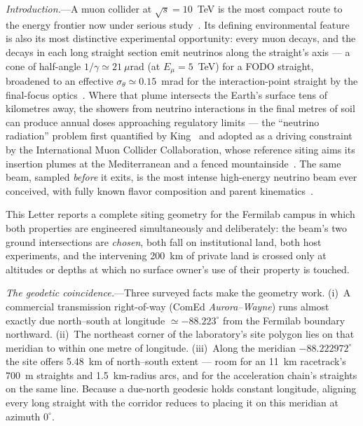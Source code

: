 \documentclass[aps,prl,reprint,superscriptaddress,nofootinbib]{revtex4-2}
\begin{document}
\emph{Introduction.}---A muon collider at
$\sqrt{s}=10$~TeV is the most compact route to the
energy frontier now under serious study~\cite{MCForum,IMCC}. Its defining
environmental feature is also its most distinctive experimental
opportunity: every muon decays, and the decays in each long straight
section emit neutrinos along the straight's axis --- a cone of half-angle
$1/\gamma \simeq 21~\mu$rad (at $E_\mu = 5$~TeV) for a FODO straight,
broadened to an effective $\sigma_\theta \simeq 0.15$~mrad for the
interaction-point straight by the final-focus optics~\cite{MINT}.
Where that plume intersects the Earth's surface tens of kilometres
away, the showers from neutrino interactions in the final metres of soil
can produce annual doses approaching regulatory limits --- the
``neutrino radiation'' problem first quantified by King~\cite{King} and
adopted as a driving constraint by the International Muon Collider
Collaboration, whose reference siting aims its insertion plumes at the
Mediterranean and a fenced mountainside~\cite{IMCC}. The same beam,
sampled \emph{before} it exits, is the most intense high-energy neutrino
beam ever conceived, with fully known flavor composition and parent
kinematics~\cite{NuSlice}.

This Letter reports a complete siting geometry for the Fermilab campus in
which both properties are engineered simultaneously and deliberately: the
beam's two ground intersections are \emph{chosen}, both fall on
institutional land, both host experiments, and the intervening 200~km of
private land is crossed only at altitudes or depths at which no surface
owner's use of their property is touched.

\emph{The geodetic coincidence.}---Three surveyed facts make the geometry
work. (i)~A commercial transmission right-of-way (ComEd
\emph{Aurora--Wayne}) runs almost exactly due north--south at longitude
$\simeq -88.223^\circ$ from the Fermilab boundary northward.
(ii)~The northeast corner of the laboratory's site polygon lies on that
meridian to within one metre of longitude. (iii)~Along the meridian
$-88.222972^\circ$ the site offers 5.48~km of north--south extent ---
room for an 11~km racetrack's 700~m straights and 1.5~km-radius arcs, and
for the acceleration chain's straights on the same line. Because a
due-north geodesic holds constant longitude, aligning every long straight
with the corridor reduces to placing it on this meridian at azimuth
$0^\circ$.
\end{document}

